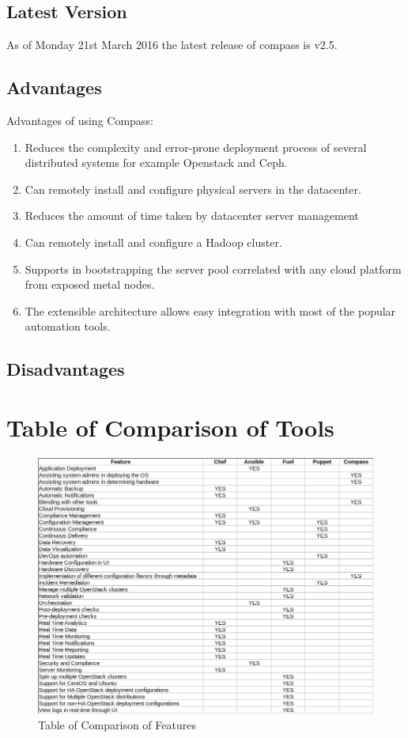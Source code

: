\documentclass[a4paper, 12pt]{article}
\begin{document}
\subsection{Latest Version}
As of Monday 21st March 2016 the latest release of compass is v2.5.

\subsection{Advantages}
Advantages of using Compass:
\begin{enumerate}
\item
Reduces the complexity and error-prone deployment process of several distributed systems for example Openstack and Ceph.
\item
Can remotely install and configure physical servers in the datacenter.
\item
Reduces the amount of time taken by datacenter server management 
\item
Can remotely install and configure a Hadoop cluster.
\item
Supports in bootstrapping the server pool correlated with any cloud platform from exposed metal nodes.
\item
The extensible architecture allows easy integration with most of the popular automation tools.
\end{enumerate}

\subsection{Disadvantages}

\section{Table of Comparison of Tools}
\begin{figure}[H]
	\centering
	\includegraphics[width=\linewidth]{img/table_comp.png}
  	\caption{Table of Comparison of Features}
	\label{fig:table_comp}
\end{figure}
\end{document}
